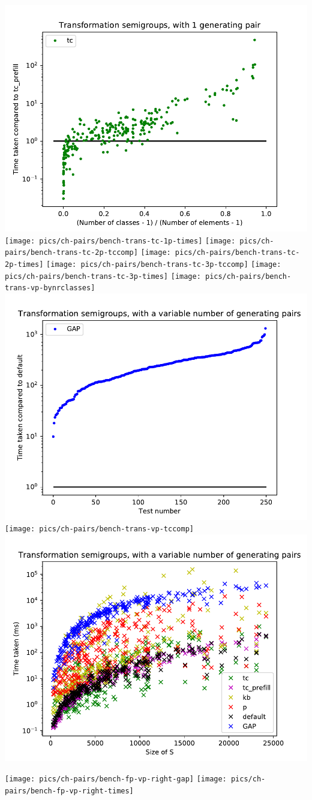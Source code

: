 \includegraphics[width=\textwidth]{pics/ch-pairs/bench-trans-tc-1p-tccomp}
\texttt{[image: pics/ch-pairs/bench-trans-tc-1p-times]}
\texttt{[image: pics/ch-pairs/bench-trans-tc-2p-tccomp]}
\texttt{[image: pics/ch-pairs/bench-trans-tc-2p-times]}
\texttt{[image: pics/ch-pairs/bench-trans-tc-3p-tccomp]}
\texttt{[image: pics/ch-pairs/bench-trans-tc-3p-times]}
\texttt{[image: pics/ch-pairs/bench-trans-vp-bynrclasses]}
\includegraphics[width=\textwidth]{pics/ch-pairs/bench-trans-vp-gap}
\texttt{[image: pics/ch-pairs/bench-trans-vp-tccomp]}
\includegraphics[width=\textwidth]{pics/ch-pairs/bench-trans-vp-times}

\clearpage

\texttt{[image: pics/ch-pairs/bench-fp-vp-right-gap]}
\texttt{[image: pics/ch-pairs/bench-fp-vp-right-times]}
